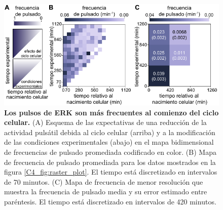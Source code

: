 \documentclass[./main.tex]{subfiles}
\begin{document}
\begin{figure}
    \centering
    \includegraphics[width=1\columnwidth]{figures/chapter4/C4_cell_cycle.pdf}\caption{\textbf{Los pulsos de ERK son más frecuentes al comienzo del ciclo celular.} (A) Esquema de las expectativas de una reducción de la actividad pulsátil debida al ciclo celular (arriba) y a la modificación de las condiciones experimentales (abajo) en el mapa bidimensional de frecuencias de pulsado promediada codificado en color. (B) Mapa de frecuencia de pulsado promediada para los datos mostrados en la figura \ref{C4_fig:raster_plot}. El tiempo está discretizado en intervalos de 70 minutos. (C) Mapa de frecuencia de menor resolución que muestra la frecuencia de pulsado media y su error estimado entre paréntesis. El tiempo está discretizado en intervalos de 420 minutos.}
    \label{C4_fig:cell_cycle_effect}
\end{figure}
\end{document}
